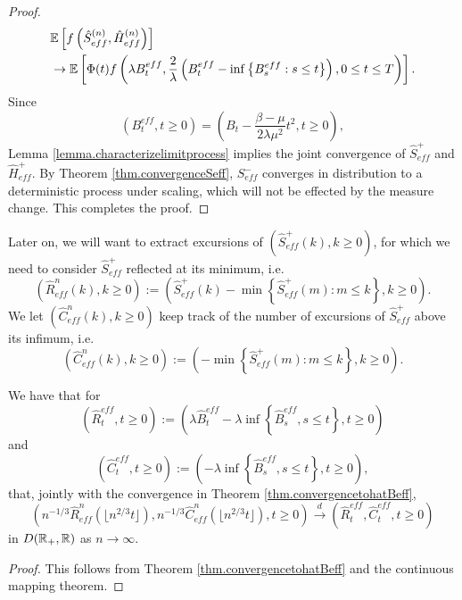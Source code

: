 \begin{proof}
\begin{align*}
    &{\mathbb E}\left[f\left(\hat{S}_{eff}^{(n)},  \hat{H}_{eff}^{(n)}\right) \right]\\
    &\to {\mathbb E}\left[\Phi(t)f\left(\lambda B_t^{eff},\frac{2}{\lambda}\left(B_t^{eff}-\inf\left\{B_s^{eff}:s\leq t\right\}\right),0\leq t \leq T\right)\right].
\end{align*}
Since $$(B^{eff}_t,t\geq 0)=\left(B_t-\frac{\beta - \mu}{2\lambda \mu^2}t^2,t\geq 0\right),$$
Lemma \ref{lemma.characterizelimitprocess} implies the joint convergence of $\hat{S}^+_{eff}$ and $\hat{H}^+_{eff}$. By Theorem \ref{thm.convergenceSeff}, $S^-_{eff}$ converges in distribution to a deterministic process under scaling, which will not be effected by the measure change. This completes the proof. 
\end{proof}

Later on, we will want to extract excursions of $(\hat{S}_{eff}^+(k), k\geq 0)$, for which we need to consider $\hat{S}^+_{eff}$ reflected at its minimum, i.e.
$$(\hat{R}^n_{eff}(k),k\geq 0):=\left(\hat{S}_{eff}^+(k)-\min\left\{\hat{S}_{eff}^+(m):m\leq k\right\},k\geq 0\right).$$ We let $(\hat{C}^n_{eff}(k), k\geq 0)$ keep track of the number of excursions of $\hat{S}^+_{eff}$ above its infimum, i.e.
$$(\hat{C}^n_{eff}(k),k\geq 0):=\left(-\min\left\{\hat{S}_{eff}^+(m):m\leq k\right\},k\geq 0\right).$$
\begin{corollary}\label{cor.convergencereflected}
We have that for 
$$(\hat{R}^{eff}_t,t\geq 0):=\left(\lambda \hat{B}^{eff}_t-\lambda\inf\left\{\hat{B}^{eff}_s, s\leq t\right\},t\geq 0\right)$$
and
$$(\hat{C}^{eff}_t,t\geq 0):=\left(-\lambda\inf\left\{\hat{B}^{eff}_s, s\leq t\right\},t\geq 0\right),$$
that, jointly with the convergence in Theorem \ref{thm.convergencetohatBeff},
$$\left(n^{-1/3}\hat{R}^n_{eff}\left(\lfloor n^{2/3}t\rfloor\right),n^{-1/3}\hat{C}^n_{eff}\left(\lfloor n^{2/3}t\rfloor\right), t\geq 0\right)\overset{d}{\to}\left(\hat{R}^{eff}_t,\hat{C}^{eff}_t,t\geq 0\right)$$
in $D({\mathbb R}_+,{\mathbb R})$ as $n\to \infty$.
\end{corollary}
\begin{proof}
This follows from Theorem \ref{thm.convergencetohatBeff} and the continuous mapping theorem.
\end{proof}


